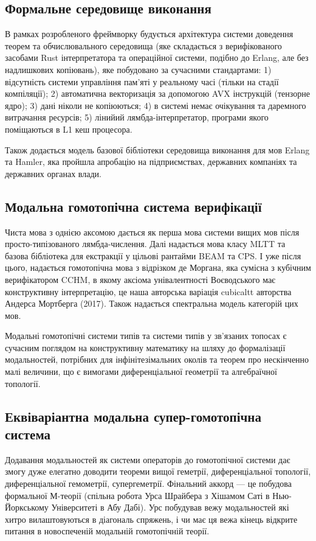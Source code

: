 \subsection{Формальне середовище виконання}
В рамках розробленого фреймворку будується
архітектура системи доведення теорем та обчислювального
середовища (яке складається з верифікованого засобами Rust
інтерпретатора та операційної системи, подібно до Erlang, але без надлишкових копіювань),
яке побудовано за сучасними стандартами:
1) відсутність системи управління пам'яті у реальному часі (тільки на стадії компіляції);
2) автоматична векторизація за допомогою AVX інструкцій (тензорне ядро);
3) дані ніколи не копіюються;
4) в системі немає очікування та даремного витрачання ресурсів;
5) лінийий лямбда-інтерпретатор, програми якого поміщаються в L1 кеш процесора.

Також додається модель базової бібліотеки середовища виконання для мов Erlang та Hamler,
яка пройшла апробацію на підприємствах, державних компаніях та державних органах влади.

\subsection{Модальна гомотопічна система верифікації}
Чиста мова з однією аксомою дається як перша мова системи вищих мов після просто-типізованого лямбда-числення.
Далі надається мова класу MLTT та базова бібліотека для екстракції у цільові рантайми BEAM та CPS.
І уже після цього, надається гомотопічна мова з відрізком де Моргана, яка сумісна з кубічним верифікатором CCHM,
в якому аксіома унівалентності Воєводського має конструктивну інтерпретацію,
це наша авторська варіація cubicaltt авторства Андерса Мортберга (2017).
Також надається спектральна модель категорій цих мов.

Модальні гомотопічні системи типів та системи типів у зв'язаних топосах є сучасним поглядом на
конструктивну математику на шляху до формалізації модальностей, потрібних для інфінітезімальних околів та
теорем про нескінченно малі величини, що є вимогами диференціальної геометрії та алгебраїчної топології.

\subsection{Еквіваріантна модальна супер-гомотопічна система}
Додавання модальностей як системи операторів до гомотопічної системи дає змогу дуже
елегатно доводити теореми вищої геметрії, диференціальної топології, диференціальної
гемометрії, супергеметрії. Фінальний аккорд --- це побудова формальної М-теорії (спільна робота Урса Шрайбера
з Хішамом Саті в Нью-Йоркському Університеті в Абу Дабі). Урс побудував вежу модальностей які хитро вилаштовуються
в діагональ спряжень, і чи має ця вежа кінець відкрите питання в новоспеченій модальній гомотопічній теорії.

